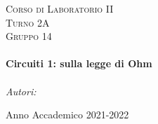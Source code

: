 \documentclass[a4paper]{article}
\begin{document}
\begin{titlepage}
\center
    
\textsc{\LARGE Corso di Laboratorio II}\\[1.5cm] %
\textsc{\large Turno 2A}\\[0.5cm] %
\textsc{\large Gruppo 14}\\[0.5cm]

\HRule \\[0.6cm]
{ \huge \bfseries Circuiti 1: sulla legge di Ohm}\\[0.4cm] %
\HRule \\[1.5cm]
    

\Large \emph{Autori:} \\

\vspace{8cm}

{\large Anno Accademico 2021-2022}\\[2cm] %


\vfill
\end{titlepage}




\tableofcontents
\clearpage

\listoffigures
{}
\clearpage

\setcounter{page}{1}

\end{document}
